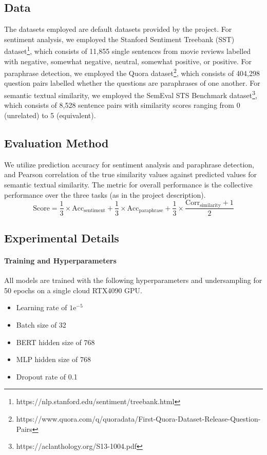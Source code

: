 \documentclass{article}
\begin{document}
  \subsection{Data}
    The datasets employed are default datasets provided by the project.
    For sentiment analysis, we employed the Stanford Sentiment Treebank (SST) dataset\footnote{https://nlp.stanford.edu/sentiment/treebank.html}\cite{socher2013recursive}, 
    which consists of 11,855 single sentences from movie reviews labelled with negative, somewhat negative, neutral, somewhat positive, or positive.
    For paraphrase detection, we employed the Quora dataset\footnote{https://www.quora.com/q/quoradata/First-Quora-Dataset-Release-Question-Pairs},
    which consists of 404,298 question pairs labelled whether the questions are paraphrases of one another.
    For semantic textual similarity, we employed the SemEval STS Benchmark dataset\footnote{https://aclanthology.org/S13-1004.pdf}\cite{agirre2013sem},
    which consists of 8,528 sentence pairs with similarity scores ranging from 0 (unrelated) to 5 (equivalent).

  \subsection{Evaluation Method}
    We utilize prediction accuracy for sentiment analysis and paraphrase detection,
    and Pearson correlation of the true similarity values against predicted values for semantic textual similarity.
    The metric for overall performance is the collective performance over the three tasks (as in the project description).
    \begin{equation}
    \mathrm{Score} = \frac{1}{3} \times \mathrm{Acc_{sentiment}} + \frac{1}{3} \times \mathrm{Acc_{paraphrase}} + \frac{1}{3} \times \frac{\mathrm{Corr_{similarity}} + 1}{2}
    \end{equation}

  \subsection{Experimental Details}

    \paragraph{Training and Hyperparameters} All models are trained with the following hyperparameters and undersampling for 50 epochs on a single cloud RTX4090 GPU.
      \begin{itemize}
        \item Learning rate of $1\mathrm{e}^{-5}$
        \item Batch size of 32
        \item BERT hidden size of 768
        \item MLP hidden size of 768
        \item Dropout rate of 0.1
      \end{itemize}
    
\end{document}
